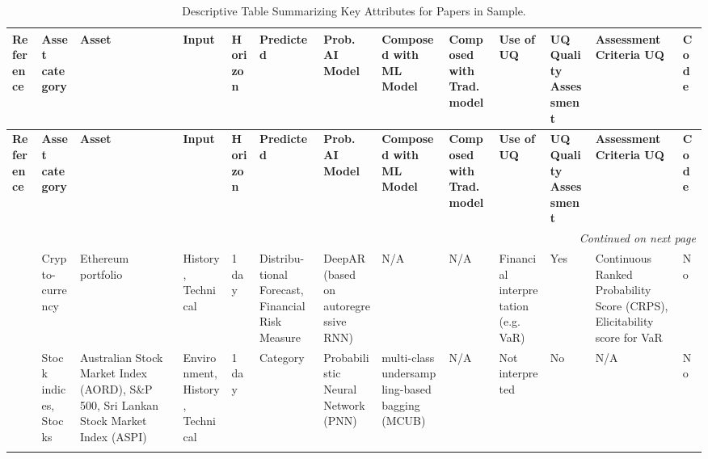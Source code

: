 \begin{landscape}
    \begin{longtable}{p{0.07\textheight} p{0.07\textheight} p{0.16\textheight} p{0.07\textheight} p{0.07\textheight} p{0.07\textheight} p{0.14\textheight} p{0.09\textheight} p{0.07\textheight} p{0.07\textheight} >{\centering\arraybackslash}p{0.06\textheight} p{0.1\textheight} p{0.03\textheight}}
        \caption[Descriptive Table Summarizing Key Attributes for Papers in Sample]{Descriptive Table Summarizing Key Attributes for Papers in Sample.}
        \label{table:paper_info_summary} \\
        \toprule
        \textbf{Reference} & \textbf{Asset category} & \textbf{Asset} & \textbf{Input} & \textbf{Horizon} & \textbf{Predicted} & \textbf{Prob. AI Model} & \textbf{Composed with ML Model} & \textbf{Composed with Trad. model} & \textbf{Use of UQ} & \textbf{UQ Quality Assessment} & \textbf{Assessment Criteria UQ} & \textbf{Code} \\
        \midrule
        \endfirsthead

        \toprule

        \textbf{Reference} & \textbf{Asset category} & \textbf{Asset} & \textbf{Input} & \textbf{Horizon} & \textbf{Predicted} & \textbf{Prob. AI Model} & \textbf{Composed with ML Model} & \textbf{Composed with Trad. model} & \textbf{Use of UQ} & \textbf{UQ Quality Assessment} & \textbf{Assessment Criteria UQ} & \textbf{Code} \\
        \midrule
        \endhead

        \midrule
        \multicolumn{13}{r}{\textit{Continued on next page}} \\
        \midrule
        \endfoot

        \bottomrule
        \endlastfoot

        \textcite{Almeida2024RiskForecasting} & Crypto-currency & Ethereum portfolio & History, Technical & 1 day & Distribu-tional Forecast, Financial Risk Measure & DeepAR (based on autoregressive RNN) & N/A & N/A & Financial interpretation (e.g. VaR) & Yes & Continuous Ranked Probability Score (CRPS), Elicitability score for VaR & No \\
        \addlinespace
        \hdashline[0.2pt/3pt]
        \addlinespace
        
        \textcite{Chandrasekara2019pnn} & Stock indices, Stocks & Australian Stock Market Index (AORD), S\&P 500, Sri Lankan Stock Market Index (ASPI) & Environment, History, Technical & 1 day & Category & Probabilistic Neural Network (PNN) & multi-class undersampling-based bagging (MCUB) & N/A & Not interpreted & No & N/A & No \\
        \addlinespace
        \hdashline[0.2pt/3pt]
        \addlinespace
        

\end{longtable}
\end{landscape}
